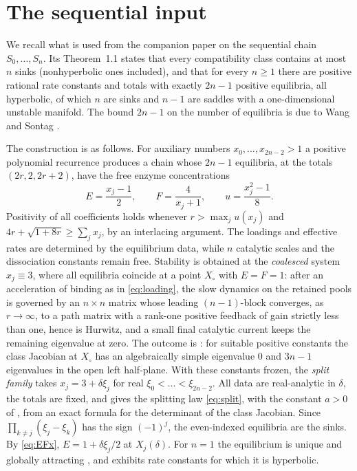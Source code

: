 \section{The sequential input}\label{app:sequential}
We recall what is used from the companion paper \cite{Companion} on the sequential chain
\(S_0,\dots,S_n\). Its Theorem~1.1 states that every compatibility class contains at most
\(n\) sinks (nonhyperbolic ones included), and that for every \(n\ge1\) there are positive
rational rate constants and totals with exactly \(2n-1\) positive equilibria, all hyperbolic,
of which \(n\) are sinks and \(n-1\) are saddles with a one-dimensional unstable manifold. The
bound \(2n-1\) on the number of equilibria is due to Wang and Sontag \cite{WangSontag2008}.

The construction is as follows. For auxiliary numbers \(x_0,\dots,x_{2n-2}>1\) a positive
polynomial recurrence produces a chain whose \(2n-1\) equilibria, at the totals
\((2r,2,2r+2)\), have the free enzyme concentrations
\begin{equation}\label{eq:EFx}
 E=\frac{x_j-1}{2},\qquad F=\frac{4}{x_j+1},\qquad u=\frac{x_j^2-1}{8}.
\end{equation}
Positivity of all coefficients holds whenever \(r>\max_ju(x_j)\) and
\(4r+\sqrt{1+8r}\ge\sum_jx_j\), by an interlacing argument. The loadings and effective rates
are determined by the equilibrium data, while \(n\) catalytic scales and the dissociation
constants remain free. Stability is obtained at the \emph{coalesced} system \(x_j\equiv3\),
where all equilibria coincide at a point \(X_\circ\) with \(E=F=1\): after an acceleration
of binding as in \eqref{eq:loading}, the slow dynamics on the retained pools is governed by an
\(n\times n\) matrix whose leading \((n-1)\)-block converges, as \(r\to\infty\), to a path
matrix with a rank-one positive feedback of gain strictly less than one, hence is Hurwitz, and
a small final catalytic current keeps the remaining eigenvalue at zero. The outcome is
\cite[Lemma~7.2]{Companion}: for suitable positive constants the class Jacobian at \(X_\circ\)
has an algebraically simple eigenvalue \(0\) and \(3n-1\) eigenvalues in the open left
half-plane. With these constants frozen, the \emph{split family} takes
\(x_j=3+\delta\xi_j\) for real \(\xi_0<\dots<\xi_{2n-2}\). All data are real-analytic in
\(\delta\), the totals are fixed, and \cite[Theorem~1.2]{Companion} gives the splitting law
\eqref{eq:split}, with the constant \(a>0\) of \cite[(7.2)]{Companion}, from an exact formula for
the determinant of the class Jacobian. Since \(\prod_{k\ne j}(\xi_j-\xi_k)\) has the sign
\((-1)^j\), the even-indexed equilibria are the sinks. By \eqref{eq:EFx}, \(E=1+\delta\xi_j/2\)
at \(X_j(\delta)\). For \(n=1\) the equilibrium is unique and globally attracting
\cite{AngeliSontag2008}, and \cite{Companion} exhibits rate constants for which it is
hyperbolic.


